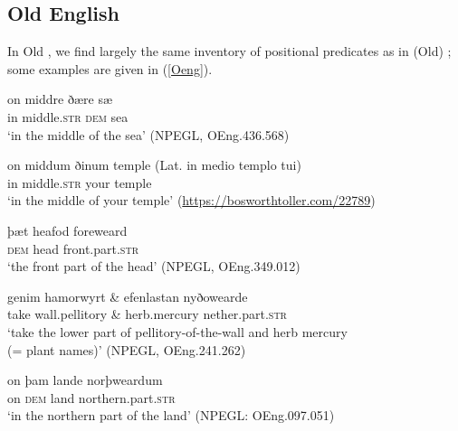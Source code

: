 \documentclass[output=paper,colorlinks,citecolor=brown]{langscibook}
\begin{document}
\subsection{Old English}
\label{sec:10:oeng}

In Old , we find largely the same inventory of positional predicates as in (Old) ; some examples are given in (\ref{Oeng}).


\begin{exe}
   \ex \label{Oeng}  
    \begin{xlist}
     \ex \gll  on middre   ðære sæ     \\ 
       in middle.\textsc{str} \textsc{dem} sea \\ 
       \glt `in the middle of the sea' (NPEGL, OEng.436.568)      

      \ex \label{Oengb} \gll on middum ðinum temple  \hspace{2mm}(Lat. in medio templo tui)  \\ 
       in middle.\textsc{str} your temple  \\ 
       \glt `in the middle of your temple' (\url{https://bosworthtoller.com/22789})


      \ex \gll   þæt heafod   foreweard   \\ 
       \textsc{dem} head  front.part.\textsc{str} \\  
       \glt `the front part of the head' (NPEGL, OEng.349.012)          

    \ex \gll genim hamorwyrt \& efenlastan nyðowearde   \\ 
      take wall.pellitory \& herb.mercury nether.part.\textsc{str} \\ 
       \glt `take the lower part of pellitory-of-the-wall and herb mercury \\ (= plant names)' (NPEGL, OEng.241.262)              

      \ex \gll on  þam  lande norþweardum   \\ 
       on  \textsc{dem} land northern.part.\textsc{str} \\  
       \glt `in the northern part of the land' (NPEGL: OEng.097.051)
   \end{xlist}
\end{exe} 
\end{document}
